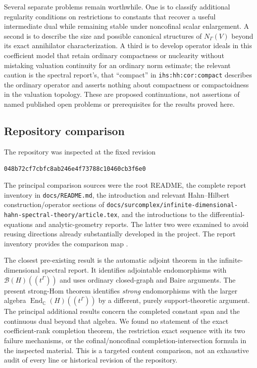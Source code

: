 \documentclass[11pt,letterpaper]{article}
\numberwithin{equation}{section}
\theoremstyle{definition}
\theoremstyle{remark}
\newcommand{\C}{\mathbb C}
\newcommand{\End}{\operatorname{End}}
\newcommand{\Commit}{048b72cf7cbfc8ab246e4f73788c10460cb3f6e0}
\newcommand{\ihs}[1]{\texttt{ihs:#1}}
\begin{document}
Several separate problems remain worthwhile. One is to classify
additional regularity conditions on restrictions to constants that
recover a useful intermediate dual while remaining stable under
noncofinal scalar enlargement. A second is to describe the size and
possible canonical structures of $N_\Gamma(V)$ beyond its exact
annihilator characterization. A third is to develop operator ideals in
this coefficient model that retain ordinary compactness or nuclearity
without mistaking valuation continuity for an ordinary norm estimate;
the relevant caution is the spectral report's, that ``compact'' in
\ihs{hh:cor:compact} describes the ordinary operator and asserts nothing
about compactness or compactoidness in the valuation topology. These are proposed continuations, not assertions of named published
open problems or prerequisites for the results proved here.

\subsection{Repository comparison}
The repository was inspected at the fixed revision
\begin{center}\small\texttt{\Commit}\end{center}
The principal comparison sources were the root README, the complete
report inventory in \texttt{docs/README.md}, the introduction and
relevant Hahn--Hilbert construction/operator sections of
\texttt{docs/surcomplex/infinite-dimensional-hahn-spectral-theory/article.tex},
and the introductions to the differential-equations and
analytic-geometry reports. The latter two were examined to avoid
reusing directions already substantially developed in the project.
The report inventory provides the comparison map \cite{RepoInventory}.

The closest pre-existing result is the automatic adjoint theorem in the
infinite-dimensional spectral report. It identifies adjointable
endomorphisms with $\mathcal B(H)((t^\Gamma))$ and uses ordinary
closed-graph and Baire arguments. The present strong-Hom theorem
identifies \emph{strong} endomorphisms with the larger algebra
$\End_\C(H)((t^\Gamma))$ by a different, purely support-theoretic
argument. The principal additional results concern the completed
constant span and the continuous dual beyond that algebra. We found
no statement of the exact coefficient-rank completion theorem, the
restriction exact sequence with its two failure mechanisms, or the
cofinal/noncofinal completion-intersection formula in the inspected
material. This is a targeted content comparison, not an exhaustive
audit of every line or historical revision of the repository.
\end{document}
